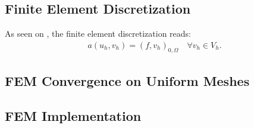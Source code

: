 \subsection{Finite Element Discretization}
As seen on , the finite element discretization reads:
\begin{gather}
	a(u_h, v_h) = (f, v_h)_{0, \Omega} \quad \forall v_h \in V_h.
\end{gather}

\subsection{FEM Convergence on Uniform Meshes}


\subsection{FEM Implementation}

